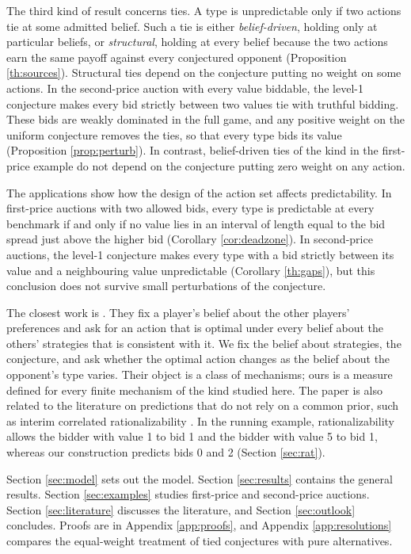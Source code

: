 \documentclass[12pt]{article}
\theoremstyle{definition}
\begin{document}
The third kind of result concerns ties. A type is unpredictable only if two actions tie at some admitted belief. Such a tie is either \emph{belief-driven}, holding only at particular beliefs, or \emph{structural}, holding at every belief because the two actions earn the same payoff against every conjectured opponent (Proposition \ref{th:sources}). Structural ties depend on the conjecture putting no weight on some actions. In the second-price auction with every value biddable, the level-1 conjecture makes every bid strictly between two values tie with truthful bidding. These bids are weakly dominated in the full game, and any positive weight on the uniform conjecture removes the ties, so that every type bids its value (Proposition \ref{prop:perturb}). In contrast, belief-driven ties of the kind in the first-price example do not depend on the conjecture putting zero weight on any action.

The applications show how the design of the action set affects predictability. In first-price auctions with two allowed bids, every type is predictable at every benchmark if and only if no value lies in an interval of length equal to the bid spread just above the higher bid (Corollary \ref{cor:deadzone}). In second-price auctions, the level-1 conjecture makes every type with a bid strictly between its value and a neighbouring value unpredictable (Corollary \ref{th:gaps}), but this conclusion does not survive small perturbations of the conjecture.

The closest work is \citet{borgersli2019strategically}. They fix a player's belief about the other players' preferences and ask for an action that is optimal under every belief about the others' strategies that is consistent with it. We fix the belief about strategies, the conjecture, and ask whether the optimal action changes as the belief about the opponent's type varies. Their object is a class of mechanisms; ours is a measure defined for every finite mechanism of the kind studied here. The paper is also related to the literature on predictions that do not rely on a common prior, such as interim correlated rationalizability \citep{dfm2007icr, weinsteinyildiz2007}. In the running example, rationalizability allows the bidder with value 1 to bid 1 and the bidder with value 5 to bid 1, whereas our construction predicts bids 0 and 2 (Section \ref{sec:rat}).

Section \ref{sec:model} sets out the model. Section \ref{sec:results} contains the general results. Section \ref{sec:examples} studies first-price and second-price auctions. Section \ref{sec:literature} discusses the literature, and Section \ref{sec:outlook} concludes. Proofs are in Appendix \ref{app:proofs}, and Appendix \ref{app:resolutions} compares the equal-weight treatment of tied conjectures with pure alternatives.
\end{document}
